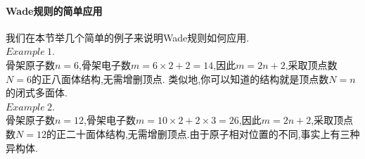 \documentclass{ctexart}
\begin{document}
\paragraph{Wade规则的简单应用}
我们在本节举几个简单的例子来说明Wade规则如何应用.\\
$\mathit{Example\ 1.}$\ \\
\indent 骨架原子数$n=6$,骨架电子数$m=6\times2+2=14$,因此$m=2n+2$,采取顶点数$N=6$的正八面体结构,无需增删顶点.
类似地,你可以知道的结构就是顶点数$N=n$的闭式多面体.\\
$\mathit{Example\ 2.}$\ \\
\indent 骨架原子数$n=12$,骨架电子数$m=10\times2+2\times3=26$,因此$m=2n+2$,采取顶点数$N=12$的正二十面体结构,无需增删顶点.由于原子相对位置的不同,事实上有三种异构体.\vspace{-5pt}
\end{document}
